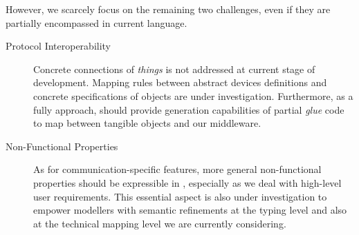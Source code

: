 However, we scarcely focus on the remaining two challenges, even if they are partially encompassed in current language.

\begin{description}
	\item[Protocol Interoperability] Concrete connections of \textit{things} is not addressed at current stage of development. Mapping rules between abstract devices definitions and concrete specifications of objects are under investigation. Furthermore, as a fully \MDE approach, \IOTDSL should provide generation capabilities of partial \textit{glue} code to map between tangible objects and our \CEP middleware.

	\item[Non-Functional Properties] As for communication-specific features, more general non-functional properties should be expressible in \IOTDSL, especially as we deal with high-level user requirements. This essential aspect is also under investigation to empower modellers with semantic refinements at the typing level and also at the technical mapping level we are currently considering.
\end{description}